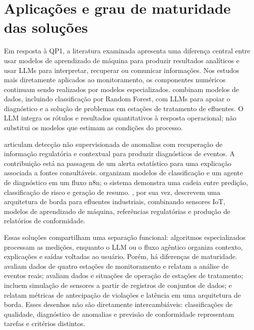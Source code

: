 \normalsize
\setlength{\tabcolsep}{6pt}
\renewcommand{\arraystretch}{1.0}

\endgroup

\section{Aplicações e grau de maturidade das soluções}
\label{sec:ea-aplicacoes}

Em resposta à QP1, a literatura examinada apresenta uma diferença central entre usar modelos de aprendizado de máquina para produzir resultados analíticos e usar LLMs para interpretar, recuperar ou comunicar informações. Nos estudos mais diretamente aplicados ao monitoramento, os componentes numéricos continuam sendo realizados por modelos especializados.  combinam modelos de dados, incluindo classificação por Random Forest, com LLMs para apoiar o diagnóstico e a solução de problemas em estações de tratamento de efluentes. O LLM integra os rótulos e resultados quantitativos à resposta operacional; não substitui os modelos que estimam as condições do processo.

 articulam detecção não supervisionada de anomalias com recuperação de informação regulatória e contextual para produzir diagnósticos de eventos. A contribuição está na passagem de um alerta estatístico para uma explicação associada a fontes consultáveis.  organizam modelos de classificação e um agente de diagnóstico em um fluxo n8n; o sistema demonstra uma cadeia entre predição, classificação de risco e geração de resumo. , por sua vez, descrevem uma arquitetura de borda para efluentes industriais, combinando sensores IoT, modelos de aprendizado de máquina, referências regulatórias e produção de relatórios de conformidade.

Essas soluções compartilham uma separação funcional: algoritmos especializados processam as medições, enquanto o LLM ou o fluxo agêntico organiza contexto, explicações e saídas voltadas ao usuário. Porém, há diferenças de maturidade.  avaliam dados de quatro estações de monitoramento e relatam a análise de eventos reais;  avaliam dados e situações de operação de estações de tratamento;  incluem simulação de sensores a partir de registros de conjuntos de dados; e  relatam métricas de antecipação de violações e latência em uma arquitetura de borda. Esses desenhos não são diretamente intercambiáveis: classificações de qualidade, diagnóstico de anomalias e previsão de conformidade representam tarefas e critérios distintos.

